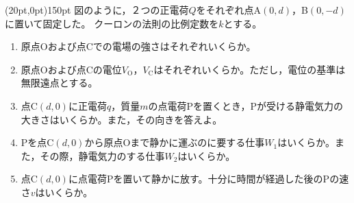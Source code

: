 \hakosyokika
\item
    \begin{mawarikomi}(20pt,0pt){150pt}{}
           図のように，２つの正電荷$Q$をそれぞれ点A$(0,d)$，B$(0,-d)$に置いて固定した。
           クーロンの法則の比例定数を$k$とする。
        \begin{enumerate}
            \item 原点Oおよび点Cでの電場の強さはそれぞれいくらか。
            \item 原点Oおよび点Cの電位$V_\mathrm{O}$，$V_\mathrm{C}$はそれぞれいくらか。ただし，電位の基準は無限遠点とする。
            \item 点C$(d,0)$に正電荷$q$，質量$m$の点電荷Pを置くとき，Pが受ける静電気力の大きさはいくらか。また，その向きを答えよ。
            \item Pを点C$(d,0)$から原点Oまで静かに運ぶのに要する仕事$W_1$はいくらか。また，その際，静電気力のする仕事$W_2$はいくらか。
            \item 点C$(d,0)$に点電荷Pを置いて静かに放す。十分に時間が経過した後のPの速さ$v$はいくらか。
        \end{enumerate}
    \end{mawarikomi}
